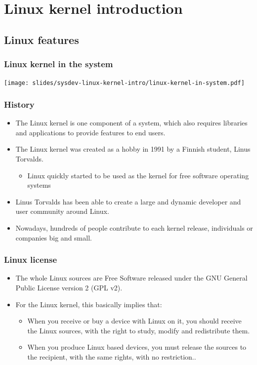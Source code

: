 \section{Linux kernel introduction}

\subsection{Linux features}

\begin{frame}
  \frametitle{Linux kernel in the system}
  \begin{center}
    \texttt{[image: slides/sysdev-linux-kernel-intro/linux-kernel-in-system.pdf]}
  \end{center}
\end{frame}

\begin{frame}
  \frametitle{History}
  \begin{itemize}
  \item The Linux kernel is one component of a system, which also
    requires libraries and applications to provide features to end
    users.
  \item The Linux kernel was created as a hobby in 1991 by a Finnish
    student, Linus Torvalds.
    \begin{itemize}
    \item Linux quickly started to be used as the kernel for free
      software operating systems
    \end{itemize}
  \item Linus Torvalds has been able to create a large and dynamic
    developer and user community around Linux.
  \item Nowadays, hundreds of people contribute to each kernel
    release, individuals or companies big and small.
  \end{itemize}
\end{frame}

\begin{frame}
  \frametitle{Linux license}
  \begin{itemize}
  \item The whole Linux sources are Free Software released under the
    GNU General Public License version 2 (GPL v2).
  \item For the Linux kernel, this basically implies that:
    \begin{itemize}
    \item When you receive or buy a device with Linux on it, you
      should receive the Linux sources, with the right to study,
      modify and redistribute them.
    \item When you produce Linux based devices, you must release the
      sources to the recipient, with the same rights, with no
      restriction..
    \end{itemize}
  \end{itemize}
\end{frame}

